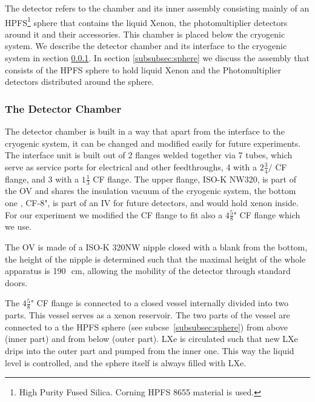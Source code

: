 The detector refers to the chamber and its inner assembly consisting 
mainly of an HPFS\footnote{High Purity Fused Silica. Corning HPFS 8655 material is used.} sphere that 
contains the liquid Xenon, the photomultiplier detectors around it and their accessories. 
This chamber is placed below the cryogenic system.  
We describe the detector chamber and its interface to the cryogenic system in 
section \ref{subsubsec:detchamber}. In section \ref{subsubsec:sphere} we discuss the assembly 
that consists of the HPFS sphere to hold liquid Xenon and the Photomultiplier detectors distributed 
around the sphere.
\subsubsection{The Detector Chamber}
\label{subsubsec:detchamber}

The detector chamber is built in a way that apart from the interface to the cryogenic system, it can 
be changed and modified easily for future experiments. The interface unit is built out of 2 flanges 
welded together via 7 tubes, which serve as service ports for electrical and other feedthroughs, 4 
with a $2 \frac{3}{4}/$ CF flange, and 3 with a $1\frac{1}{3}$ CF flange. 
The upper flange, ISO-K NW320, is part of the OV and shares the insulation vacuum of the cryogenic 
system, the bottom one , CF-8", is part of an IV for future detectors, and would hold xenon inside. 
For our experiment we modified the CF flange to fit also a $4\frac{5}{8}$" CF 
flange which we use.

The OV is made of a ISO-K 320NW nipple closed with a blank from the bottom, 
the height of the nipple is determined such that the maximal height of the whole 
apparatus is 190~\,cm, allowing the mobility of the detector through standard doors.
 
The $4\frac{5}{8}$" CF flange is connected to a closed vessel internally divided into 
two parts. This vessel serves as a xenon reservoir. The two parts of the vessel are connected 
to a the HPFS sphere (see subcse~\ref{subsubsec:sphere}) from above (inner part) and from below 
(outer part). LXe is circulated such that new LXe drips into the outer part and pumped from the 
inner one. This way the liquid level is controlled, and the sphere itself is always filled with LXe. 



